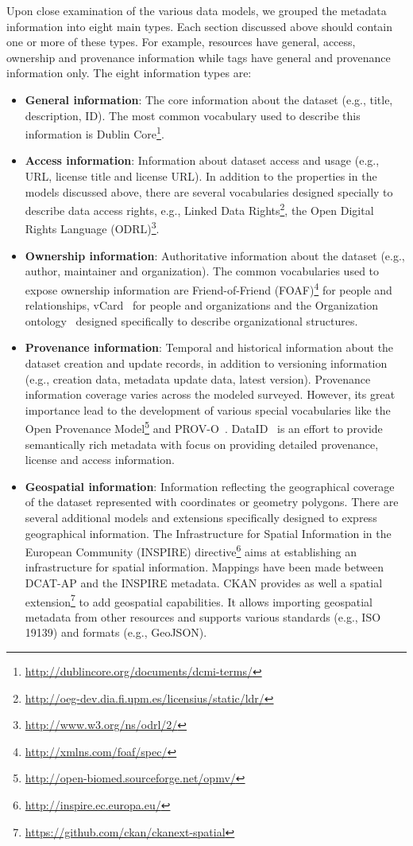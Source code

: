 \documentclass[a4paper,11pt,twoside]{ThesisStyle}
\begin{document}
Upon close examination of the various data models, we grouped the metadata information into eight main types. Each section discussed above should contain one or more of these types. For example, resources have general, access, ownership and provenance information while tags have general and provenance information only. The eight information types are:
\begin{itemize}
 \item \textbf{General information}: The core information about the dataset (e.g., title, description, ID). The most common vocabulary used to describe this information is Dublin Core\footnote{\url{http://dublincore.org/documents/dcmi-terms/}}.
 \item \textbf{Access information}: Information about dataset access and usage (e.g., URL, license title and license URL). In addition to the properties in the models discussed above, there are several vocabularies designed specially to describe data access rights, e.g., Linked Data Rights\footnote{\url{http://oeg-dev.dia.fi.upm.es/licensius/static/ldr/}}, the Open Digital Rights Language (ODRL)\footnote{\url{http://www.w3.org/ns/odrl/2/}}.
 \item \textbf{Ownership information}: Authoritative information about the dataset (e.g., author, maintainer and organization). The common vocabularies used to expose ownership information are Friend-of-Friend (FOAF)\footnote{\url{http://xmlns.com/foaf/spec/}} for people and relationships, vCard~\cite{Iannella:W3C:14} for people and organizations and the Organization ontology~\cite{Reynolds:W3C:14} designed specifically to describe organizational structures.
 \item \textbf{Provenance information}: Temporal and historical information about the dataset creation and update records, in addition to versioning information (e.g., creation data, metadata update data, latest version). Provenance information coverage varies across the modeled surveyed. However, its great importance lead to the development of various special vocabularies like the Open Provenance Model\footnote{\url{http://open-biomed.sourceforge.net/opmv/}} and PROV-O~\cite{Lebo:W3C:13}. DataID~\cite{Brummer::ICSS:14} is an effort to provide semantically rich metadata with focus on providing detailed provenance, license and access information.
 \item \textbf{Geospatial information}: Information reflecting the geographical coverage of the dataset represented with coordinates or geometry polygons. There are several additional models and extensions specifically designed to express geographical information. The Infrastructure for Spatial Information in the European Community (INSPIRE) directive\footnote{\url{http://inspire.ec.europa.eu/}} aims at establishing an infrastructure for spatial information. Mappings have been made between DCAT-AP and the INSPIRE metadata. CKAN provides as well a spatial extension\footnote{\url{https://github.com/ckan/ckanext-spatial}} to add geospatial capabilities. It allows importing geospatial metadata from other resources and supports various standards (e.g., ISO 19139) and formats (e.g., GeoJSON).

\end{itemize}
\end{document}
